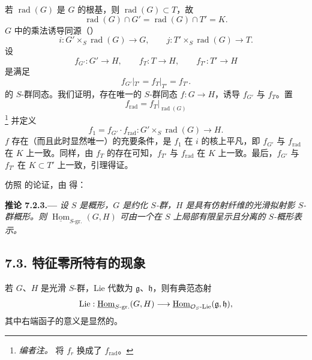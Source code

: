 若 \(\operatorname{rad}(G)\) 是 \(G\) 的根基，则 \(\operatorname{rad}(G)\subset T\)，故
\[
  \operatorname{rad}(G)\cap G'
  =
  \operatorname{rad}(G)\cap T'
  =
  K.
\]
\(G\) 中的乘法诱导同源（）
\[
  i:G'\times_S\operatorname{rad}(G)\longrightarrow G,
  \qquad
  j:T'\times_S\operatorname{rad}(G)\longrightarrow T.
\]
设
\[
  f_{G'}:G'\to H,\qquad
  f_T:T\to H,\qquad
  f_{T'}:T'\to H
\]
是满足
\[
  f_{G'}|_{T'}=f_T|_{T'}=f_{T'}.
\]
的 \(S\)-群同态。我们证明，存在唯一的 \(S\)-群同态 \(f:G\to H\)，诱导 \(f_{G'}\) 与 \(f_T\)。置
\[
  f_{\mathrm{rad}}
  =
  f_T|_{\operatorname{rad}(G)}
\]
\footnote{\textit{编者注。} 将 \(f_r\) 换成了 \(f_{\mathrm{rad}}\)。}
并定义
\[
  f_1=f_{G'}\cdot f_{\mathrm{rad}}:
  G'\times_S\operatorname{rad}(G)\longrightarrow H.
\]
\(f\) 存在（而且此时显然唯一）的充要条件，是 \(f_1\) 在 \(i\) 的核上平凡，即 \(f_{G'}\) 与 \(f_{\mathrm{rad}}\) 在 \(K\) 上一致。同样，由 \(f_T\) 的存在可知，\(f_{T'}\) 与 \(f_{\mathrm{rad}}\) 在 \(K\) 上一致。最后，\(f_{G'}\) 与 \(f_{T'}\) 在 \(K\subset T'\) 上一致，引理得证。

仿照  的论证，由 得：
\par\medskip\noindent{}\textbf{推论 7.2.3.---}\enspace
\emph{设 \(S\) 是概形，\(G\) 是约化 \(S\)-群，\(H\) 是具有仿射纤维的光滑拟射影 \(S\)-群概形。则 \(\underline{\operatorname{Hom}}_{S\text{-}\mathrm{gr.}}(G,H)\) 可由一个在 \(S\) 上局部有限呈示且分离的 \(S\)-概形表示。}

\subsection*{7.3. 特征零所特有的现象}
若 \(G\)、\(H\) 是光滑 \(S\)-群，Lie 代数为 \(\mathfrak g\)、\(\mathfrak h\)，则有典范态射
\[
  \operatorname{Lie}:
  \underline{\operatorname{Hom}}_{S\text{-}\mathrm{gr.}}(G,H)
  \longrightarrow
  \underline{\operatorname{Hom}}_{\mathcal O_S\text{-}\mathrm{Lie}}
    (\mathfrak g,\mathfrak h),
\]
其中右端函子的意义是显然的。

